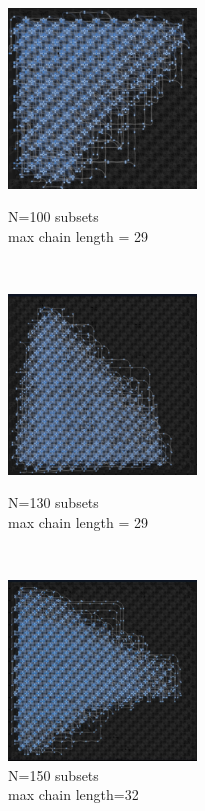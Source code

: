 \documentclass[oneside,a4paper]{article}
\begin{document}
\begin{figure}[htp]
\begin{minipage}[b]{4.5cm}
\centering
\includegraphics[width=5cm]{LaTeXTemplate/Images/Advantagefirst100.png}
\caption{N=100 subsets\\max chain length = 29}
\end{minipage}
\ \hspace{2mm} \hspace{2mm} \
\begin{minipage}[b]{4.5cm}
\centering
\includegraphics[width=5cm]{LaTeXTemplate/Images/Advantagefirst130.png}
\caption{N=130 subsets\\max chain length = 29}
\end{minipage}
\ \hspace{2mm} \hspace{2mm} \
\begin{minipage}[b]{4.5cm}
\centering
\includegraphics[width=5cm]{LaTeXTemplate/Images/Advantagefirst150.png}
\caption{N=150 subsets\\max chain length=32}
\end{minipage}
\end{figure}
\end{document}
